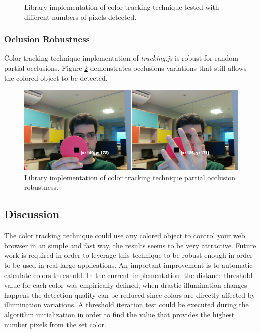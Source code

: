 \begin{figure}[!htb]
   \caption{Library implementation of color tracking technique tested with different numbers of pixels detected.}
   \label{figure:color_fps}
\end{figure}


\subsubsection{Oclusion Robustness} %
\label{subsub:evaluation:color_tracking_algorithm:results:occlusion_robustness}

Color tracking technique implementation of \textit{tracking.js} is robust for random partial occlusions. Figure \ref{figure:color_occlusion} demonstrates occlusions variations that still allows the colored object to be detected.

\begin{figure}[!htb]
  \centering
  \includegraphics[width=\linewidth]{chapters/evaluation/color_occlusion.png}
  \caption{Library implementation of color tracking technique partial occlusion robustness.}
  \label{figure:color_occlusion}
\end{figure}


\subsection{Discussion} %
\label{sub:evaluation:color_tracking_algorithm:discussion}

The color tracking technique could use any colored object to control your web browser in an simple and fast way, the results seems to be very attractive. Future work is required in order to leverage this technique to be robust enough in order to be used in real large applications. An important improvement is to automatic calculate colors threshold. In the current implementation, the distance threshold value for each color was empirically defined, when drastic illumination changes happens the detection quality can be reduced since colors are directly affected by illumination variations. A threshold iteration test could be executed during the algorithm initialization in order to find the value that provides the highest number pixels from the set color.

